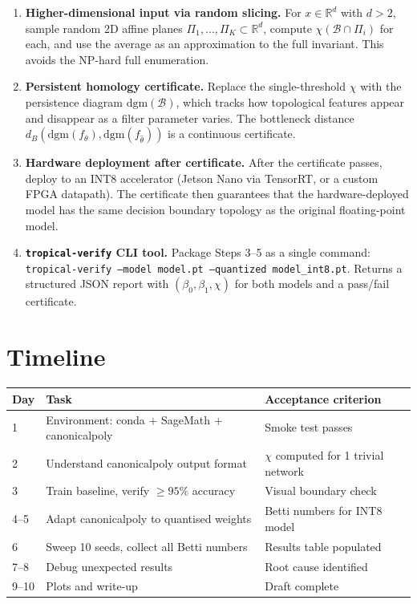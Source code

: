 \documentclass[11pt]{article}
\newcommand{\R}{\mathbb{R}}
\begin{document}
\begin{enumerate}[leftmargin=*]
\item \textbf{Higher-dimensional input via random slicing.}
  For $x \in \R^d$ with $d > 2$, sample random 2D affine planes
  $\Pi_1, \ldots, \Pi_K \subset \R^d$, compute $\chi(\mathcal{B} \cap \Pi_i)$ for each,
  and use the average as an approximation to the full invariant. This avoids the NP-hard
  full enumeration.

\item \textbf{Persistent homology certificate.}
  Replace the single-threshold $\chi$ with the persistence diagram
  $\mathrm{dgm}(\mathcal{B})$, which tracks how topological features appear and
  disappear as a filter parameter varies. The bottleneck distance
  $d_B(\mathrm{dgm}(f_\theta), \mathrm{dgm}(f_{\hat\theta}))$ is a continuous certificate.

\item \textbf{Hardware deployment after certificate.}
  After the certificate passes, deploy to an INT8 accelerator (Jetson Nano via TensorRT,
  or a custom FPGA datapath). The certificate then guarantees that the hardware-deployed
  model has the same decision boundary topology as the original floating-point model.

\item \textbf{\texttt{tropical-verify} CLI tool.}
  Package Steps 3--5 as a single command:
  \texttt{tropical-verify --model model.pt --quantized model\_int8.pt}.
  Returns a structured JSON report with $(\beta_0, \beta_1, \chi)$ for both models and
  a pass/fail certificate.
\end{enumerate}

\section{Timeline}

\begin{center}
\begin{tabular}{lll}
\toprule
Day & Task & Acceptance criterion \\
\midrule
1   & Environment: conda + SageMath + canonicalpoly & Smoke test passes \\
2   & Understand canonicalpoly output format & $\chi$ computed for 1 trivial network \\
3   & Train baseline, verify $\geq 95\%$ accuracy & Visual boundary check \\
4--5 & Adapt canonicalpoly to quantised weights & Betti numbers for INT8 model \\
6   & Sweep 10 seeds, collect all Betti numbers & Results table populated \\
7--8 & Debug unexpected results & Root cause identified \\
9--10 & Plots and write-up & Draft complete \\
\bottomrule
\end{tabular}
\end{center}
\end{document}
